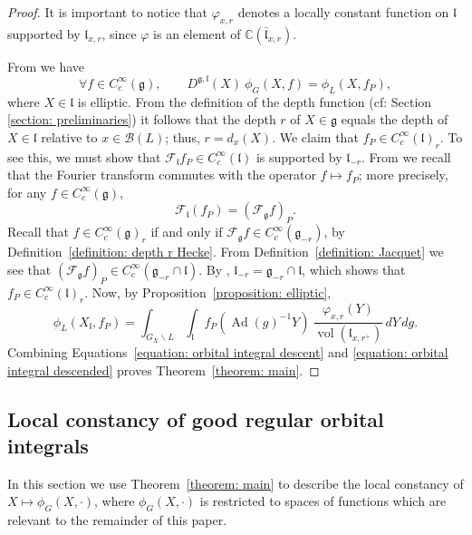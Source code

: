 \documentclass[11pt]{amsart}
\theoremstyle{definition}
\theoremstyle{remark}
\numberwithin{equation}{theorem}
\def\C{{\mathbb{C}}}
\def\GF{{G}}
\def\LF{{L}}
\def\PF{{P}}
\def\lF{{\mathfrak{l}}}
\def\gF{{\mathfrak{g}}}
\def\orbint{{\phi}}
\def\vphi{{\varphi}}
\def\B{{\mathcal{B}}}
\def\Fourier{{\mathcal{F}}}
\def\Sch#1{{C^\infty_c(#1)}}
\def\Ad{{\rm Ad}}
\def\leftcoset{{\backslash}}
\def\vol{{\operatorname{vol}}}
\def\vol{\operatorname{vol}}
\def\Ad{\operatorname{Ad}}
\begin{document}
\begin{proof}
It is important to notice that $\vphi_{x,r}$ denotes a locally
constant function on $\lF$ supported by $\lF_{x,r}$, since $\vphi$
is an element of $\C(\bar{\lF}_{x,r})$.

From \cite{Harish-Chandra} we have
\begin{equation}\label{equation: orbital integral descent}
    \forall f\in\Sch{\gF},
\qquad
D^{\gF,\lF}(X)\ \orbint_\GF(X,f)
    = \orbint_\LF(X,f_\PF),
\end{equation}
where $X\in \lF$ is elliptic. From the definition of the depth
function (cf: Section \ref{section: preliminaries}) it follows
that the depth $r$ of $X\in\gF$ equals the depth of $X\in\lF$
relative to $x\in \B(\LF)$; thus, $r = d_x(X)$. We claim that
$f_\PF \in \Sch{\lF}_r$. To see this, we must show that
$\Fourier_\lF f_\PF\in \Sch{\lF}$ is supported by $\lF_{-r}$. From
\cite{Harish-Chandra} we recall that the Fourier transform
commutes with the operator $f \mapsto f_\PF$; more precisely, for
any $f\in C^\infty_c(\gF)$,
\begin{equation}
\Fourier_\lF(f_P) = (\Fourier_\gF f)_P.
\end{equation}
Recall that $f\in \Sch{\gF}_r$ if and only if $\Fourier_\gF f \in
\Sch{\gF_{-r}}$, by Definition~\ref{definition: depth r Hecke}.
From Definition~\ref{definition: Jacquet} we see that
$(\Fourier_\gF f)_P \in \Sch{\gF_{-r}\cap \lF}$. By
\cite[3.5.3]{Adler-DeBacker}, $\lF_{-r} = \gF_{-r} \cap \lF$,
which shows that $f_\PF \in \Sch{\lF}_r$. Now, by
Proposition~\ref{proposition: elliptic},
\begin{equation}\label{equation: orbital integral descended}
\orbint_\LF(X_\lF,f_\PF) =  \int_{\GF_X\leftcoset\LF} \int_{\lF}
f_\PF(\Ad(g)^{-1}Y)\ \frac{\vphi_{x,r}(Y)}{\vol(\lF_{x,r^+})} \,
dY\, dg.
\end{equation}
Combining Equations~\ref{equation: orbital integral descent} and
\ref{equation: orbital integral descended} proves
Theorem~\ref{theorem: main}.
\end{proof}




\subsection{Local constancy of good regular orbital
integrals}\label{local constancy}

In this section we use Theorem~\ref{theorem: main} to describe the
local constancy of $X \mapsto \orbint_\GF(X,\cdot)$, where
$\orbint_\GF(X,\cdot)$ is restricted to spaces of functions which
are relevant to the remainder of this paper.
\end{document}
